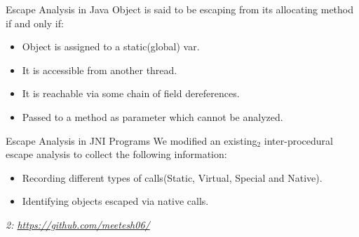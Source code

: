\begin{frame}{Escape Analysis in Java}
    Object is said to be escaping from its allocating method if and only if:
    \begin{itemize}
        \vspace{3mm}
        \item Object is assigned to a static(global) var.
        \vspace{3mm}
        \item It is accessible from another thread.
        \vspace{3mm}
        \item It is reachable via some chain of field dereferences.
        \vspace{3mm}
        \item Passed to a method as parameter which cannot be analyzed.
    \end{itemize}
\end{frame}

\begin{frame}{Escape Analysis in JNI Programs}
    We modified an existing$_2$ inter-procedural escape analysis to collect the following information:
    \begin{itemize}
        \vspace{3mm}
        \item Recording different types of calls(Static, Virtual, Special and Native).
        \vspace{3mm}
        \item Identifying objects escaped via native calls.
    \end{itemize}
    \vspace{3cm}
    \tiny
    \textit{2: \url{https://github.com/meetesh06/}}
\end{frame}

